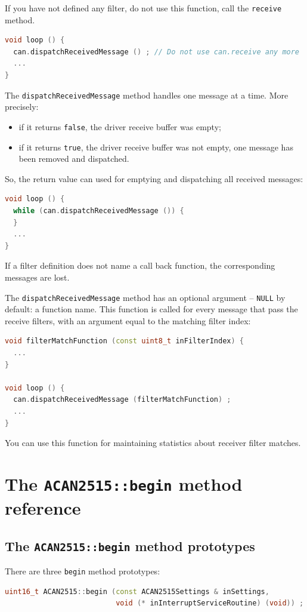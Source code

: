 \documentclass[10pt, a4paper, obeyspaces]{extarticle}
\newcommand \sectionLabel[2]{\section{#1}\label{sec:#2}}
\begin{document}
If you have not defined any filter, do not use this function, call the \texttt{receive} method.


{ \small\begin{lstlisting}[language=c++]
void loop () {
  can.dispatchReceivedMessage () ; // Do not use can.receive any more
  ...
}
\end{lstlisting}}

The \texttt{dispatchReceivedMessage} method handles one message at a time. More precisely:
\begin{itemize}
  \item if it returns \texttt{false}, the driver receive buffer was empty;
  \item if it returns \texttt{true}, the driver receive buffer was not empty, one message has been removed and dispatched.
\end{itemize}

So, the return value can used for emptying and dispatching all received messages:
{ \small\begin{lstlisting}[language=c++]
void loop () {
  while (can.dispatchReceivedMessage ()) {
  }
  ...
}
\end{lstlisting}}

If a filter definition does not name a call back function, the corresponding messages are lost.

The \texttt{dispatchReceivedMessage} method has an optional argument -- \texttt{NULL} by default: a function name. This function is called for every message that pass the receive filters, with an argument equal to the matching filter index:

{ \small\begin{lstlisting}[language=c++]
void filterMatchFunction (const uint8_t inFilterIndex) {
  ...
}

void loop () {
  can.dispatchReceivedMessage (filterMatchFunction) ;
  ...
}
\end{lstlisting}}

You can use this function for maintaining statistics about receiver filter matches.


\sectionLabel{The \texttt{ACAN2515::begin} method reference}{beginMethodReference}

\subsection{The \texttt{ACAN2515::begin} method prototypes}

There are three \texttt{begin} method prototypes:
{ \small\begin{lstlisting}[language=c++]
uint16_t ACAN2515::begin (const ACAN2515Settings & inSettings,
                          void (* inInterruptServiceRoutine) (void)) ;
\end{lstlisting}}
\end{document}
